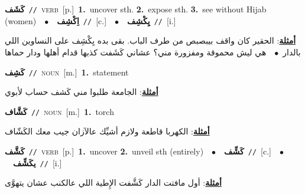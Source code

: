 \documentclass[10pt,a4paper,twoside]{article} %
\begin{document}
\begin{multicols}{2}
{\setlength\topsep{0pt}\textbf{\foreignlanguage{arabic}{كَشَف}}\ {\color{gray}\texttt{//}\color{black}}\ \textsc{verb}\ [p.]\ \textbf{1.}~uncover sth.  \textbf{2.}~expose sth.  \textbf{3.}~see without Hijab (women)\ \ $\bullet$\ \ \setlength\topsep{0pt}\textbf{\foreignlanguage{arabic}{اِكْشِف}}\ {\color{gray}\texttt{//}\color{black}}\ [c.]\ \ $\bullet$\ \ \setlength\topsep{0pt}\textbf{\foreignlanguage{arabic}{يِكْشِف}}\ {\color{gray}\texttt{//}\color{black}}\ [i.]\  \begin{flushright}\color{gray}\foreignlanguage{arabic}{\textbf{\underline{\foreignlanguage{arabic}{أمثلة}}}: الحقير كان واقف بيبصبص من طرف الباب. بقى بده يِكْشِف على النساوين اللي بالدار\ $\bullet$\ \  هي ليش محموقة ومفزورة مني؟ عشاني كَشَفت كذبها قدام أهلها ودار حماها}\end{flushright}\color{black}} \vspace{2mm}

{\setlength\topsep{0pt}\textbf{\foreignlanguage{arabic}{كَشِف}}\ {\color{gray}\texttt{//}\color{black}}\ \textsc{noun}\ [m.]\ \textbf{1.}~statement\  \begin{flushright}\color{gray}\foreignlanguage{arabic}{\textbf{\underline{\foreignlanguage{arabic}{أمثلة}}}: الجامعة طلبوا مني كَشف حساب لأبوي}\end{flushright}\color{black}} \vspace{2mm}

{\setlength\topsep{0pt}\textbf{\foreignlanguage{arabic}{كَشَّاف}}\ {\color{gray}\texttt{//}\color{black}}\ \textsc{noun}\ [m.]\ \textbf{1.}~torch\  \begin{flushright}\color{gray}\foreignlanguage{arabic}{\textbf{\underline{\foreignlanguage{arabic}{أمثلة}}}: الكهربا قاطعة ولازم أشيِّك عالآزان جيب معك الكَشّاف}\end{flushright}\color{black}} \vspace{2mm}

{\setlength\topsep{0pt}\textbf{\foreignlanguage{arabic}{كَشَّف}}\ {\color{gray}\texttt{//}\color{black}}\ \textsc{verb}\ [p.]\ \textbf{1.}~uncover  \textbf{2.}~unveil sth (entirely)\ \ $\bullet$\ \ \setlength\topsep{0pt}\textbf{\foreignlanguage{arabic}{كَشِّف}}\ {\color{gray}\texttt{//}\color{black}}\ [c.]\ \ $\bullet$\ \ \setlength\topsep{0pt}\textbf{\foreignlanguage{arabic}{يكَشِّف}}\ {\color{gray}\texttt{//}\color{black}}\ [i.]\  \begin{flushright}\color{gray}\foreignlanguage{arabic}{\textbf{\underline{\foreignlanguage{arabic}{أمثلة}}}: أول مافتت الدار كَشَّفت الإِطية اللي عالكنب عشان يتهوَّى}\end{flushright}\color{black}} \vspace{2mm}


\end{multicols}
\end{document}
